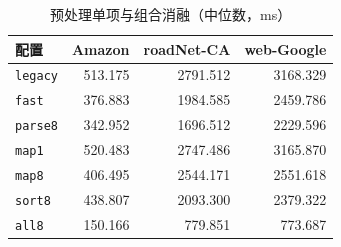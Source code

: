 \begin{table}[htbp]
\centering
\small
\caption{预处理单项与组合消融（中位数，ms）}\label{tab:ablation}
\begin{tabular}{lrrr}
\toprule
配置 & Amazon & roadNet-CA & web-Google \\
\midrule
\texttt{legacy} & 513.175 & 2791.512 & 3168.329 \\
\texttt{fast} & 376.883 & 1984.585 & 2459.786 \\
\texttt{parse8} & 342.952 & 1696.512 & 2229.596 \\
\texttt{map1} & 520.483 & 2747.486 & 3165.870 \\
\texttt{map8} & 406.495 & 2544.171 & 2551.618 \\
\texttt{sort8} & 438.807 & 2093.300 & 2379.322 \\
\texttt{all8} & 150.166 & 779.851 & 773.687 \\
\bottomrule
\end{tabular}
\par{}
\end{table}
